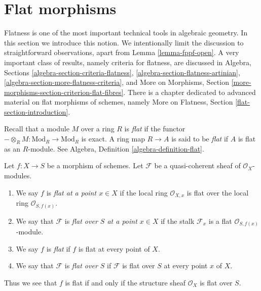 \section{Flat morphisms}
\label{section-flat}

\noindent
Flatness is one of the most important technical tools in algebraic geometry.
In this section we introduce this notion. We intentionally limit the discussion
to straightforward observations, apart from Lemma \ref{lemma-fppf-open}.
A very important class of results, namely criteria for flatness, are
discussed in
Algebra, Sections \ref{algebra-section-criteria-flatness},
\ref{algebra-section-flatness-artinian},
\ref{algebra-section-more-flatness-criteria}, and
More on Morphisms, Section
\ref{more-morphisms-section-criterion-flat-fibres}.
There is a chapter dedicated to advanced material on flat morphisms of
schemes, namely More on Flatness, Section \ref{flat-section-introduction}.

\medskip\noindent
Recall that a module $M$ over a ring $R$ is {\it flat} if the functor
$-\otimes_R M : \text{Mod}_R \to \text{Mod}_R$ is exact. A ring map
$R \to A$ is said to be {\it flat} if $A$ is flat as an $R$-module.
See
Algebra, Definition \ref{algebra-definition-flat}.

\begin{definition}
\label{definition-flat}
Let $f : X \to S$ be a morphism of schemes.
Let $\mathcal{F}$ be a quasi-coherent sheaf of $\mathcal{O}_X$-modules.
\begin{enumerate}
\item We say $f$ is {\it flat at a point $x \in X$} if the
local ring $\mathcal{O}_{X, x}$ is flat over the local ring
$\mathcal{O}_{S, f(x)}$.
\item We say that $\mathcal{F}$ is {\it flat over $S$ at a point $x \in X$}
if the stalk $\mathcal{F}_x$ is a flat $\mathcal{O}_{S, f(x)}$-module.
\item We say $f$ is {\it flat} if $f$ is flat at every point of $X$.
\item We say that $\mathcal{F}$ is {\it flat over $S$} if
$\mathcal{F}$ is flat over $S$ at every point $x$ of $X$.
\end{enumerate}
\end{definition}

\noindent
Thus we see that $f$ is flat if and only if
the structure sheaf $\mathcal{O}_X$ is flat over $S$.


